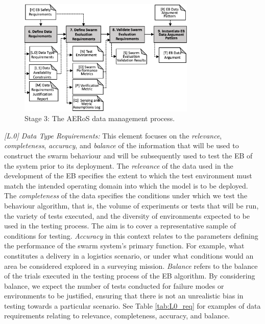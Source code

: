 \documentclass[runningheads]{llncs}
\begin{document}
\begin{figure}[!t]
	\centering
	\includegraphics[width=0.75\textwidth]{figures/AMLAS-STAGE-3-V4.png}
	\vspace{-2ex}
	\caption{Stage 3: The AERoS data management process.}
	\label{amlas-a-stage3}
	\vspace{-4ex}
\end{figure}

\emph{[L.0] Data Type Requirements:}
This element focuses on the \emph{relevance}, \emph{completeness}, \emph{accuracy}, and \emph{balance} of the information that will be used to construct the swarm behaviour and will be subsequently used to test the EB of the system prior to its deployment. The \emph{relevance} of the data used in the development of the EB specifies the extent to which the test environment must match the intended operating domain into which the model is to be deployed. The \emph{completeness} of the data specifies the conditions under which we test the behaviour algorithm, that is, the volume of experiments or tests that will be run, the variety of tests executed, and the diversity of environments expected to be used in the testing process. The aim is to cover a representative sample of conditions for testing. \emph{Accuracy} in this context relates to the parameters defining the performance of the swarm system's primary function. For example, what constitutes a delivery in a logistics scenario, or under what conditions would an area be considered explored in a surveying mission. \emph{Balance} refers to the balance of the trials executed in the testing process of the EB algorithm. By considering balance, we expect the number of tests conducted for failure modes or environments to be justified, ensuring that there is not an unrealistic bias in testing towards a particular scenario. See Table \ref{tab:L0_req} for examples of data requirements relating to relevance, completeness, accuracy, and balance.
\end{document}
